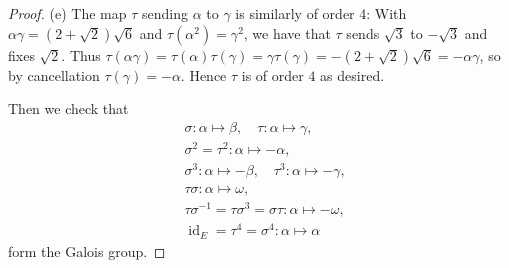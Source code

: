 \documentclass[11pt]{article}
\DeclareMathOperator{\id}{id}
\begin{document}
\begin{enumerate}
\begin{proof}
        (e) The map $\tau$ sending $\alpha$ to $\gamma$ is similarly of order $4$: With $\alpha\gamma = (2+\sqrt{2})\sqrt{6}$ and $\tau(\alpha^2) = \gamma^2$, we have that $\tau$ sends $\sqrt{3}$ to $-\sqrt{3}$ and fixes $\sqrt{2}$. Thus $\tau(\alpha\gamma) = \tau(\alpha)\tau(\gamma) = \gamma\tau(\gamma) = -(2+\sqrt{2})\sqrt{6} = -\alpha\gamma$, so by cancellation $\tau(\gamma) = -\alpha$. Hence $\tau$ is of order $4$ as desired.

        Then we check that \begin{align*}
            &\sigma\colon\alpha\mapsto\beta,\quad \tau\colon\alpha\mapsto\gamma,\\
            &\sigma^2 = \tau^2\colon\alpha\mapsto-\alpha,\\
            &\sigma^3\colon\alpha\mapsto-\beta,\quad\tau^3\colon\alpha\mapsto-\gamma,\\
            &\tau\sigma\colon\alpha\mapsto\omega,\\
            &\tau\sigma^{-1} = \tau\sigma^3 = \sigma\tau\colon\alpha\mapsto-\omega,\\
            &\id_E=\tau^4= \sigma^4\colon\alpha\mapsto\alpha
        \end{align*} form the Galois group.


\end{proof}
\end{enumerate}
\end{document}
